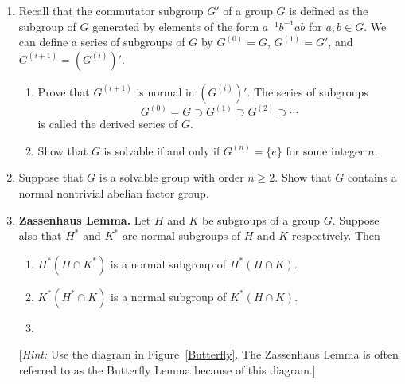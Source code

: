 {\begin{enumerate}
\item
Recall that the {\bfi commutator
subgroup\/} $G'$ of a group $G$ is
defined as the subgroup of $G$ generated by elements of the form
$a^{-1} b ^{-1} ab$ for $a, b \in G$.  We can define a series of
subgroups of $G$ by $G^{(0)} = G$, $G^{(1)} = G'$, and $G^{(i+1)} =
(G^{(i)})'$.
\begin{enumerate}
 
\item
Prove that $G^{(i+1)}$ is normal in $(G^{(i)})'$.  The series of
subgroups
\[
G^{(0)} = G \supset G^{(1)} \supset G^{(2)} \supset \cdots
\]
is called the {\bfi derived series\/} of $G$.
 
\item
Show that $G$ is solvable if and only if $G^{(n)} = \{ e \}$ for some
integer $n$.
 
\end{enumerate}
 
 
\item
Suppose that $G$ is a solvable group with order $n \geq 2$.
Show that $G$ contains a normal nontrivial abelian factor group.
 
 
 
 
\item
{\bf Zassenhaus Lemma.}
Let $H$ and $K$ be subgroups of a group $G$. Suppose also that $H^*$
and $K^*$ are normal subgroups of $H$ and $K$ respectively.  Then
\begin{enumerate}
 
\item
$H^* ( H \cap K^*)$ is a normal subgroup of $H^* ( H \cap K)$.
 
\item
$K^* ( H^* \cap K)$ is a normal subgroup of $K^* ( H \cap K)$.
 
\item
{}
 

\end{enumerate}
[{\em Hint:\/} Use the diagram in Figure~\ref{Butterfly}. The Zassenhaus Lemma is often
referred to as the Butterfly Lemma because of this diagram.]
\begin{figure}[htb]



\end{figure}
\end{enumerate}}
